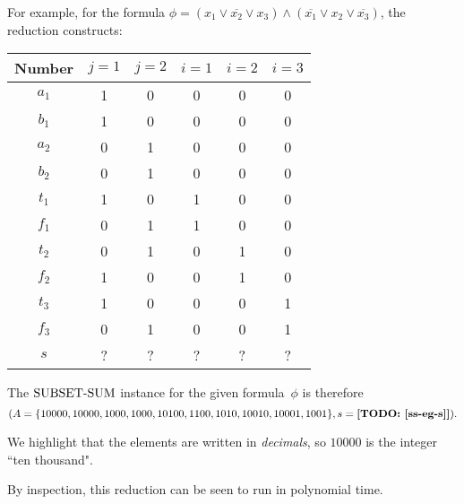 \documentclass[11pt,addpoints, answers]{exam}
\begin{document}
\begin{questions}
  For example, for the formula $\phi = (x_1 \vee \overline{x_2} \vee x_3) \wedge (\overline{x_1} \vee x_2 \vee \overline{x_3})$, the reduction constructs:
  \begin{center}
    \begin{tabular}{| c || c | c | c | c | c |}
      \hline
      Number & $j=1$ & $j=2$ & $i=1$ & $i=2$ & $i = 3$ \\ \hline \hline
      $a_1$ & 1 & 0 & 0 & 0 & 0 \\ \hline
      $b_1$ & 1 & 0 & 0 & 0 & 0 \\ \hline
      $a_2$ & 0 & 1 & 0 & 0 & 0 \\ \hline
      $b_2$ & 0 & 1 & 0 & 0 & 0 \\ \hline \hline
      $t_1$ & 1 & 0 & 1 & 0 & 0 \\ \hline
      $f_1$ & 0 & 1 & 1 & 0 & 0 \\ \hline \hline
      $t_2$ & 0 & 1 & 0 & 1 & 0 \\ \hline
      $f_2$ & 1 & 0 & 0 & 1 & 0 \\ \hline \hline
      $t_3$ & 1 & 0 & 0 & 0 & 1 \\ \hline
      $f_3$ & 0 & 1 & 0 & 0 & 1 \\ \hline \hline \hline
      $s$   & ? & ? & ? & ? & ? \\ \hline
    \end{tabular}
  \end{center}

  The $\text{SUBSET-SUM}$ instance for the given formula~$\phi$ is therefore
  \[ (A=\set{10000,10000,1000,1000,10100,1100,1010,10010,10001,1001},s=\textbf{[TODO: \cref{ss-eg-s}]}).
  \] 

  We highlight that the elements are written in \emph{decimals}, so $10000$ is the integer ``ten thousand".
  
  By inspection, this reduction can be seen to run in polynomial time.

\end{questions}
\end{document}
